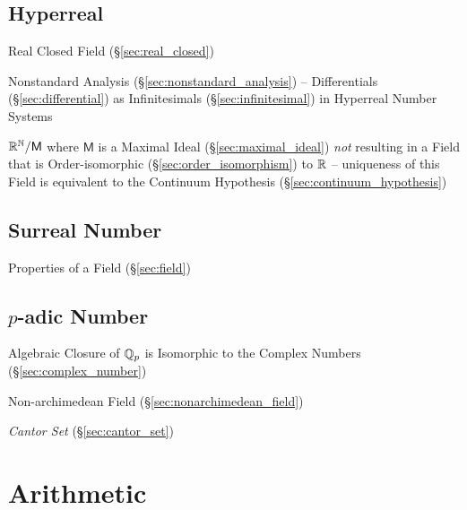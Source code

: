 \subsection{Hyperreal}\label{sec:hyperreal}

Real Closed Field (\S\ref{sec:real_closed})

\fist Nonstandard Analysis (\S\ref{sec:nonstandard_analysis}) -- Differentials
  (\S\ref{sec:differential}) as Infinitesimals (\S\ref{sec:infinitesimal}) in
  Hyperreal Number Systems

$\mathbb{R}^{\mathbb{N}} / \mathsf{M}$ where $\mathsf{M}$ is a Maximal Ideal
(\S\ref{sec:maximal_ideal}) \emph{not} resulting in a Field that is
Order-isomorphic (\S\ref{sec:order_isomorphism}) to $\mathbb{R}$ --
uniqueness of this Field is equivalent to the Continuum Hypothesis
(\S\ref{sec:continuum_hypothesis})



\subsection{Surreal Number}\label{sec:surreal_number}

Properties of a Field (\S\ref{sec:field})



\subsection{$p$-adic Number}\label{sec:padic_number}

Algebraic Closure of $\mathbb{Q}_p$ is Isomorphic to the Complex Numbers
(\S\ref{sec:complex_number})

Non-archimedean Field (\S\ref{sec:nonarchimedean_field})

\emph{Cantor Set} (\S\ref{sec:cantor_set})



\section{Arithmetic}\label{sec:arithmetic}

